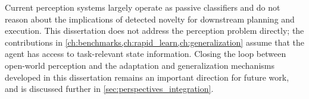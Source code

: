 Current perception systems largely operate as passive classifiers and do not reason about the implications of detected novelty for downstream planning and execution. This dissertation does not address the perception problem directly; the contributions in \cref{ch:benchmarks,ch:rapid_learn,ch:generalization} assume that the agent has access to task-relevant state information. Closing the loop between open-world perception and the adaptation and generalization mechanisms developed in this dissertation remains an important direction for future work, and is discussed further in \cref{sec:perspectives_integration}.